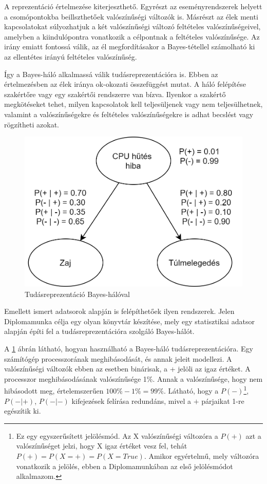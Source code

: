 A reprezentáció értelmezése kiterjeszthető. Egyrészt az eseményrendszerek helyett a csomópontokba beillszthetőek valószínűségi változók is. Másrészt az élek menti kapcsolatokat súlyozhatjuk a két valószínűségi változó feltételes valószínűségeivel, amelyben a kiindulópontra vonatkozik a célpontnak a feltételes valószínűsége. Az irány emiatt fontossá válik, az él megfordításakor a Bayes-tétellel számolható ki az ellentétes irányú feltételes valószínűség.

Így a Bayes-háló alkalmassá válik tudásreprezentációra is. Ebben az értelmezésben az élek iránya ok-okozati összefüggést mutat. A háló felépítése szakértőre vagy egy szakértői rendszerre van bízva. Ilyenkor a szakértő megkötéseket tehet, milyen kapcsolatok kell teljesüljenek vagy nem teljesülhetnek, valamint a valószínűségekre és feltételes valószínűségekre is adhat becslést vagy rögzítheti azokat. 

\begin{figure}[htp]
    \centering
    \includegraphics[width=12cm]{figures/BayesianNetwork.png}
    \caption{Tudásreprezentáció Bayes-hálóval}
    \label{fig:bayes-halo-tudasrep}
\end{figure}

Emellett ismert adatsorok alapján is felépíthetőek ilyen rendszerek. Jelen Diplomamunka célja egy olyan könyvtár készítése, mely egy statisztikai adatsor alapján építi fel a tudásreprezentációra szolgáló Bayes-hálót.

A \ref{fig:bayes-halo-tudasrep} ábrán látható, hogyan használható a Bayes-háló tudásreprezentációra. Egy számítógép processzorának meghibásodását, és annak jeleit modellezi. A valószínűségi változók ebben az esetben binárisak, a + jelöli az igaz értéket. A processzor meghibásodásának valószínűsége 1\%. Annak a valószínűsége, hogy nem hibásodott meg, értelemszerűen $100\%-1\%=99\%$. Látható, hogy a $P(-)$\footnote{Ez egy egyszerűsített jelölésmód. Az X valószínűségi változóra a $P(+)$ azt a valószínűséget jelzi, hogy X igaz értéket vesz fel, tehát $P(+) = P(X=+) = P(X=True)$. Amikor egyértelmű, mely változóra vonatkozik a jelölés, ebben a Diplomamunkában az első jelölésmódot alkalmazom.}, $P(-|+)$, $P(-|-)$ kifejezések felírása redundáns, mivel a $+$ párjaikat 1-re egészítik ki.

